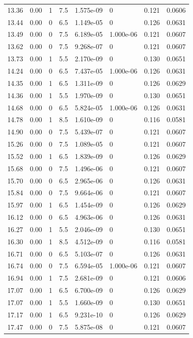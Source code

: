 \documentclass[preview]{standalone}
\begin{document}
{{{\begin{tabular}{L{1.2cm}C{1.2cm} C{0.3cm}C{0.5cm} C{1.4cm}C{1.4cm} C{1.4cm}C{1.4cm}}
  13.36  &  0.00  & 1     & 7.5 &  1.575e-09  & 0  & 0.121 &  0.0606   \\ 
  13.44  &  0.00  & 0     & 6.5 &  1.149e-05  & 0  & 0.126 &  0.0631   \\ 
  13.49  &  0.00  & 0     & 7.5 &  6.189e-05  & 1.000e-06  & 0.121 &  0.0607   \\ 
  13.62  &  0.00  & 0     & 7.5 &  9.268e-07  & 0  & 0.121 &  0.0607   \\ 
  13.73  &  0.00  & 1     & 5.5 &  2.170e-09  & 0  & 0.130 &  0.0651   \\ 
  14.24  &  0.00  & 0     & 6.5 &  7.437e-05  & 1.000e-06  & 0.126 &  0.0631   \\ 
  14.35  &  0.00  & 1     & 6.5 &  1.311e-09  & 0  & 0.126 &  0.0629   \\ 
  14.36  &  0.00  & 1     & 5.5 &  1.970e-09  & 0  & 0.130 &  0.0651   \\ 
  14.68  &  0.00  & 0     & 6.5 &  5.824e-05  & 1.000e-06  & 0.126 &  0.0631   \\ 
  14.78  &  0.00  & 1     & 8.5 &  1.610e-09  & 0  & 0.116 &  0.0581   \\ 
  14.90  &  0.00  & 0     & 7.5 &  5.439e-07  & 0  & 0.121 &  0.0607   \\ 
  15.26  &  0.00  & 0     & 7.5 &  1.089e-05  & 0  & 0.121 &  0.0607   \\ 
  15.52  &  0.00  & 1     & 6.5 &  1.839e-09  & 0  & 0.126 &  0.0629   \\ 
  15.68  &  0.00  & 0     & 7.5 &  1.496e-06  & 0  & 0.121 &  0.0607   \\ 
  15.70  &  0.00  & 0     & 6.5 &  2.965e-06  & 0  & 0.126 &  0.0631   \\ 
  15.84  &  0.00  & 0     & 7.5 &  9.664e-06  & 0  & 0.121 &  0.0607   \\ 
  15.97  &  0.00  & 1     & 6.5 &  1.454e-09  & 0  & 0.126 &  0.0629   \\ 
  16.12  &  0.00  & 0     & 6.5 &  4.963e-06  & 0  & 0.126 &  0.0631   \\ 
  16.27  &  0.00  & 1     & 5.5 &  2.046e-09  & 0  & 0.130 &  0.0651   \\ 
  16.30  &  0.00  & 1     & 8.5 &  4.512e-09  & 0  & 0.116 &  0.0581   \\ 
  16.71  &  0.00  & 0     & 6.5 &  5.103e-07  & 0  & 0.126 &  0.0631   \\ 
  16.74  &  0.00  & 0     & 7.5 &  6.594e-05  & 1.000e-06  & 0.121 &  0.0607   \\ 
  16.94  &  0.00  & 1     & 7.5 &  2.681e-09  & 0  & 0.121 &  0.0606   \\ 
  17.07  &  0.00  & 1     & 6.5 &  6.700e-09  & 0  & 0.126 &  0.0629   \\ 
  17.07  &  0.00  & 1     & 5.5 &  1.660e-09  & 0  & 0.130 &  0.0651   \\ 
  17.17  &  0.00  & 1     & 6.5 &  9.231e-10  & 0  & 0.126 &  0.0629   \\ 
  17.47  &  0.00  & 0     & 7.5 &  5.875e-08  & 0  & 0.121 &  0.0607   \\ 
\hline 
\end{tabular} 

}}}
\end{document}
